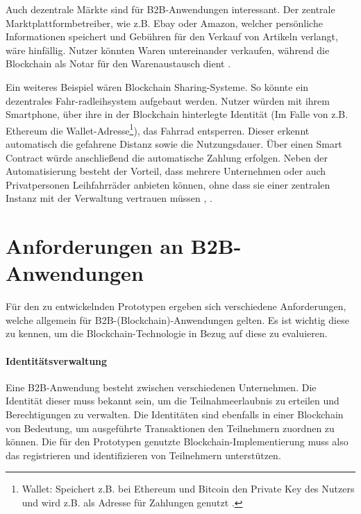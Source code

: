 Auch dezentrale Märkte sind für B2B-Anwendungen interessant. Der zentrale Marktplattformbetreiber, wie z.B. Ebay oder Amazon, welcher persönliche Informationen speichert und Gebühren für den Verkauf von Artikeln verlangt, wäre hinfällig. Nutzer könnten Waren untereinander verkaufen, während die Blockchain als Notar für den Warenaustausch dient \cite{BenHamidaBlockchainEnterpriseOverview2017}.

Ein weiteres Beispiel wären Blockchain Sharing-Systeme. So könnte ein dezentrales Fahr-radleihsystem aufgebaut werden. Nutzer würden mit ihrem Smartphone, über ihre in der Blockchain hinterlegte Identität (Im Falle von z.B. Ethereum die Wallet-Adresse\footnote{Wallet: Speichert z.B. bei Ethereum und Bitcoin den Private Key des Nutzers und wird z.B. als Adresse für Zahlungen genutzt \cite{AntonopoulosMasteringbitcoin2015}.}), das Fahrrad entsperren. Dieser erkennt automatisch die gefahrene Distanz sowie die Nutzungsdauer. Über einen Smart Contract würde anschließend die automatische Zahlung erfolgen. Neben der Automatisierung besteht der Vorteil, dass mehrere Unternehmen oder auch Privatpersonen Leihfahrräder anbieten können, ohne dass sie einer zentralen Instanz mit der Verwaltung vertrauen müssen \cite{FutureFluxFestivalBlockchainBikes}, \cite{FischerIoTBlockchain}.

\section{Anforderungen an B2B-Anwendungen}
\label{sec:general-requirements}
Für den zu entwickelnden Prototypen ergeben sich verschiedene Anforderungen, welche allgemein für B2B-(Blockchain)-Anwendungen gelten. Es ist wichtig diese zu kennen, um die Blockchain-Technologie in Bezug auf diese zu evaluieren.

\paragraph{Identitätsverwaltung}
Eine B2B-Anwendung besteht zwischen verschiedenen Unternehmen. Die Identität dieser muss bekannt sein, um die Teilnahmeerlaubnis zu erteilen und Berechtigungen zu verwalten. Die Identitäten sind ebenfalls in einer Blockchain von Bedeutung, um ausgeführte Transaktionen den Teilnehmern zuordnen zu können. Die für den Prototypen genutzte Blockchain-Implementierung muss also das registrieren und identifizieren von Teilnehmern unterstützen.


